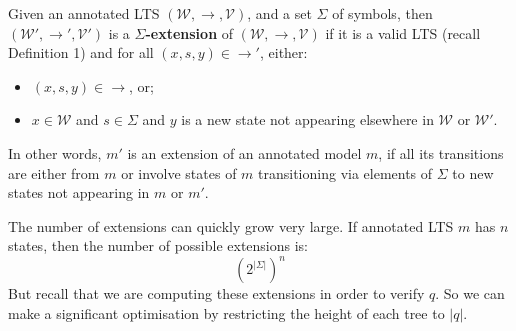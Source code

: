 \begin{definition}
Given an annotated LTS $(\mathcal{W},\rightarrow,\mathcal{V})$,  and a set $\Sigma$ of symbols, then $(\mathcal{W'},\rightarrow',\mathcal{V'})$ is a {\bf $\Sigma$-extension} of $(\mathcal{W},\rightarrow,\mathcal{V})$ if it is a valid LTS (recall Definition 1) and for all $(x,s,y) \in \rightarrow'$, either:
\begin{itemize} 
\item
$(x, s, y) \in \rightarrow$,  or;
\item
 $x \in \mathcal{W}$ and $s \in \Sigma$ and $y$ is a new state not appearing elsewhere in $\mathcal{W}$ or $\mathcal{W'}$.
\end{itemize}
\end{definition}
In other words, $m'$ is an extension of an annotated model $m$, if all its transitions are either from $m$ or involve states of $m$ transitioning via elements of $\Sigma$ to new states not appearing in $m$ or $m'$.

The number of extensions can quickly grow very large.
If annotated LTS $m$ has $n$ states, then the number of possible extensions is:
\[
({2^{|\Sigma|}})^n
\] 
But recall that we are computing these extensions in order to verify $q$. So we can make a significant optimisation by restricting the height of each tree to $|q|$.

